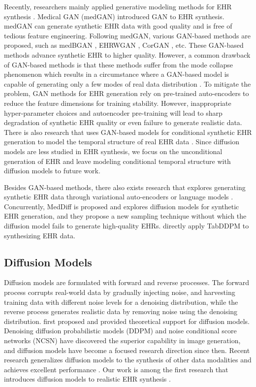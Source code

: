 Recently, researchers mainly applied generative modeling methods for EHR synthesis \citep{Ghosheh2022ARO}. Medical GAN (medGAN) \citep{pmlr-v68-choi17a} introduced GAN to EHR synthesis. medGAN can generate synthetic EHR data with good quality and is free of tedious feature engineering. Following medGAN, various GAN-based methods are proposed, such as medBGAN \citep{medbgan}, EHRWGAN \citep{EHRgan}, CorGAN \citep{Torfi2020CorGANCC}, etc. These GAN-based methods advance synthetic EHR to higher quality. 
However, a common drawback of GAN-based methods is that these methods suffer from the mode collapse phenomenon which results in a circumstance where a GAN-based model is capable of generating only a few modes of real data distribution \citep{ThanhTung2018OnCF}.
To mitigate the problem, GAN methods for EHR generation rely on pre-trained auto-encoders to reduce the feature dimensions for training stability. However, inappropriate hyper-parameter choices and autoencoder pre-training will lead to sharp degradation of synthetic EHR quality or even failure to generate realistic data. There is also research that uses GAN-based models for conditional synthetic EHR generation to model the temporal structure of real EHR data \citep{Zhang2020SynTEGAF}. Since diffusion models are less studied in EHR synthesis, we focus on the unconditional generation of EHR and leave modeling conditional temporal structure with diffusion models to future work.  

Besides GAN-based methods, there also exists research that explores generating synthetic EHR data through variational auto-encoders \citep{Biswal2020EVAGL} or language models \citep{Wang2022PromptEHRCE}. 
Concurrently, MedDiff \citep{meddiff} is proposed and explores diffusion models for synthetic EHR generation, and they propose a new sampling technique without which the diffusion model fails to generate high-quality EHRs. \citet{ceritli2023synthesizing} directly apply TabDDPM \citep{kotelnikov2022tabddpm} to synthesizing EHR data. 

\subsection{Diffusion Models}

Diffusion models are formulated with forward and reverse processes. The forward process corrupts real-world data by gradually injecting noise, and harvesting training data with different noise levels for a denoising distribution, while the reverse process generates realistic data by removing noise using the denoising distribution. \citet{pmlr-v37-sohl-dickstein15} first proposed and provided theoretical support for diffusion models. Denoising diffusion probabilistic models (DDPM) \citep{ddpm} and noise conditional score networks (NCSN) \citep{song2021scorebased} have discovered the superior capability in image generation, and diffusion models have become a focused research direction since then. Recent research generalizes diffusion models to the synthesis of other data modalities and achieves excellent performance \citep{li2022diffusionlm,kong2021diffwave}. Our work is among the first research that introduces diffusion models to realistic EHR synthesis \citep{meddiff,ceritli2023synthesizing}.

